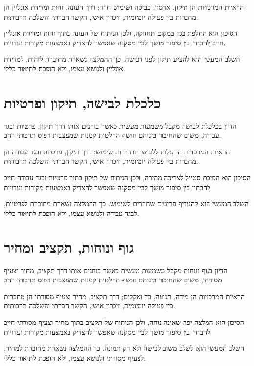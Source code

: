 הראיות המרכזיות הן תיקון, אחסון, כביסה ושימוש חוזר; דרך העונה, זהות ומדידת אונליין הן מחברות בין פעולה יומיומית, זיכרון אישי, הקשר חברתי והשלכה תרבותית.

הסיכון הוא החלפת בגד במקום תחזוקה, ולכן הניתוח של העונה בתוך זהות ומדידת אונליין חייב להבחין בין סיפור מושך לבין מסקנה שאפשר להצדיק באמצעות מקורות ועדויות.

השלב המעשי הוא להציע תיקון לפני רכישה. כך ההמלצה נשארת מחוברת לזהות, למדידת אונליין ולנושא עצמו, ולא הופכת לתיאור כללי.

\section{כלכלת לבישה, תיקון ופרטיות}
הדיון בכלכלת לבישה מקבל משמעות מעשית כאשר בוחנים אותו דרך תיקון, פרטיות ובגד עבודה, משום שהחיבור ביניהם חושף החלטות קטנות שמעצבות דפוס תרבותי רחב.

הראיות המרכזיות הן עלות ללבישה ותדירות שימוש; דרך תיקון, פרטיות ובגד עבודה הן מחברות בין פעולה יומיומית, זיכרון אישי, הקשר חברתי והשלכה תרבותית.

הסיכון הוא הפיכת סטייל לצריכה מהירה, ולכן הניתוח של תיקון בתוך פרטיות ובגד עבודה חייב להבחין בין סיפור מושך לבין מסקנה שאפשר להצדיק באמצעות מקורות ועדויות.

השלב המעשי הוא להעדיף פריטים שחוזרים לשימוש. כך ההמלצה נשארת מחוברת לפרטיות, לבגד עבודה ולנושא עצמו, ולא הופכת לתיאור כללי.

\section{גוף ונוחות, תקציב ומחיר}
הדיון בגוף ונוחות מקבל משמעות מעשית כאשר בוחנים אותו דרך תקציב, מחיר וצעיף מסורתי, משום שהחיבור ביניהם חושף החלטות קטנות שמעצבות דפוס תרבותי רחב.

הראיות המרכזיות הן מידה, תנועה, בד ואקלים; דרך תקציב, מחיר וצעיף מסורתי הן מחברות בין פעולה יומיומית, זיכרון אישי, הקשר חברתי והשלכה תרבותית.

הסיכון הוא המלצה יפה שאינה נוחה, ולכן הניתוח של תקציב בתוך מחיר וצעיף מסורתי חייב להבחין בין סיפור מושך לבין מסקנה שאפשר להצדיק באמצעות מקורות ועדויות.

השלב המעשי הוא לשלב משוב לבישה ולא רק תמונה. כך ההמלצה נשארת מחוברת למחיר, לצעיף מסורתי ולנושא עצמו, ולא הופכת לתיאור כללי.
